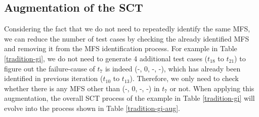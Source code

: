 \documentclass[journal,12pt,onecolumn,draftclsnofoot,]{IEEEtran}
\begin{document}
\subsection{Augmentation of the SCT}

Considering the fact that we do not need to repeatedly identify the same MFS, we can reduce the number of test cases by checking the already identified MFS and removing it from the MFS identification process. For example in Table \ref{tradition-gi}, we do not need to generate 4 additional test cases ($t_{18}$ to $t_{21}$) to figure out the failure-cause of $t_{7}$ is indeed (-, 0, -, -), which has already been identified in previous iteration ($t_{10}$ to $t_{13}$). Therefore, we only need to check whether there is any MFS other than (-, 0, -, -) in $t_{7}$ or not. When applying this augmentation, the overall SCT process of the example in Table \ref{tradition-gi} will evolve into the process shown in Table \ref{tradition-gi-aug}.
\end{document}
